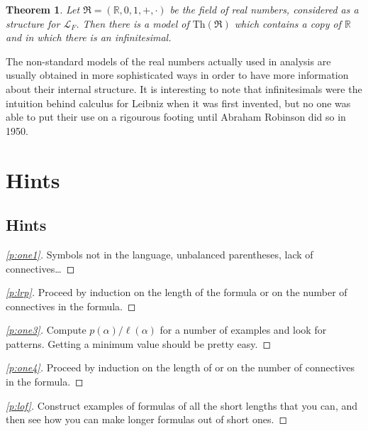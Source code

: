 \documentclass[12pt]{amsbook}
\theoremstyle{plain}
\newtheorem{thm}{Theorem}[chapter]
\theoremstyle{definition}
\theoremstyle{remark}
\newenvironment{clue}[1]%
{\begin{proof}[\ref{#1}]}%
{\renewcommand{\qed}{}\end{proof}}
\begin{document}
\begin{thm} \label{t:nsr}
Let $\mathfrak{R} = (\mathbb{R}, 0, 1, +, \cdot)$ be the field of real numbers,  considered as a structure for $\mathcal{L}_F$.  Then there is a model of $\text{Th}(\mathfrak{R})$ which contains a copy of $\mathbb{R}$ and in which there is an infinitesimal.
\end{thm}

The non-standard models of the real numbers actually used in analysis are usually obtained in more sophisticated ways in order to have more information about their internal structure.  It is interesting to note that infinitesimals were the intuition behind calculus for Leibniz when it was first invented,  but no one was able to put their use on a rigourous footing until Abraham Robinson did so in 1950.



\part*{Hints}
\setcounter{chapter}{0}


%
%

\chapter{Hints}

\begin{clue}{p:one1}
Symbols not in the language,  unbalanced parentheses,  lack of connectives\dots
\end{clue}

\begin{clue}{p:lrp}
Proceed by induction on the length of the formula or on the number of connectives in the formula.
\end{clue}

\begin{clue}{p:one3}
Compute $p(\alpha) /  \ell(\alpha)$ for a number of examples and look for patterns.  Getting a minimum value should be pretty easy.
\end{clue}

\begin{clue}{p:one4}
Proceed by induction on the length of or on the number of connectives in the formula.
\end{clue}

\begin{clue}{p:lof}
Construct examples of formulas of all the short lengths that you can,  and then see how you can make longer formulas out of short ones.
\end{clue}
\end{document}
